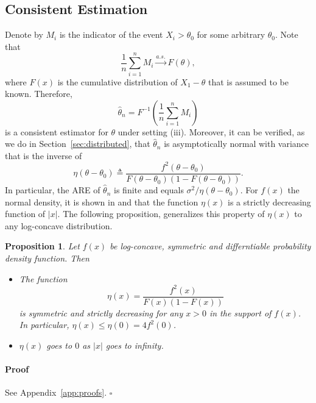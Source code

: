 \documentclass[letterpaper, conference, 11pt]{IEEEtran}      %
\newtheorem{prop}[thm]{\bf {Proposition}}
\newenvironment{proof}{\paragraph*{Proof}}{\hfill$\square$ \newline}
\begin{document}
\subsection{Consistent Estimation}
Denote by $M_i$ is the indicator of the event $X_i > \theta_0$ for some arbitrary $\theta_0$. Note that
\[
\frac{1}{n} \sum_{i=1}^n M_i \overset{a.s.}{\rightarrow} F(\theta),
\]
where $F(x)$ is the cumulative distribution of $X_1-\theta$ that is assumed to be known. Therefore, 
\begin{equation}
\label{eq:estimator_naive}
\hat{\theta}_n = F^{-1}\left( \frac{1}{n} \sum_{i=1}^n M_i \right)
\end{equation}
is a consistent estimator for $\theta$ under setting (iii). Moreover, it can be verified, as we do in Section~\ref{sec:distributed}, that $\hat{\theta}_n$ is asymptotically normal with variance that is the inverse of
\begin{equation} \label{eq:eta_def}
\eta(\theta-\theta_0) \triangleq \frac{f^2(\theta-\theta_0)} {F(\theta-\theta_0)\left(1-F(\theta-\theta_0)\right)}. 
\end{equation}
In particular, the ARE of $\hat{\theta}_n$ is finite and equals $\sigma^2/\eta(\theta - \theta_0)$. For $f(x)$ the normal density, it is shown in \cite{Samford1953} and \cite{hammersley1950estimating} that the function $\eta(x)$ is a strictly decreasing function of $|x|$. The following proposition, generalizes this property of $\eta(x)$ to any log-concave distribution.
\begin{prop} \label{prop:eta}
Let $f(x)$ be log-concave, symmetric and differntiable probability density function. Then 
\begin{itemize}
\item[(i)] The function
\[
\eta(x) = \frac{f^2(x)}{F(x) \left(1-F(x) \right)}
\]
is symmetric and strictly decreasing for any $x>0$ in the support of $f(x)$. In particular, $
\eta(x) \leq \eta(0) = 4f^2(0)$. 
\item[(ii)] $\eta(x)$ goes to $0$ as $|x|$ goes to infinity. 
\end{itemize}

\end{prop}
\begin{proof}
See Appendix~\ref{app:proofs}. 
\end{proof}
%
\end{document}
